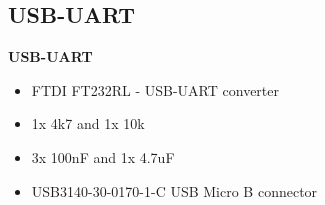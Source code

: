 
\subsection{USB-UART}

{\bf USB-UART}
\begin{itemize} \item FTDI FT232RL - USB-UART converter \item 1x 4k7 and 1x 10k
\item 3x 100nF and 1x 4.7uF \item USB3140-30-0170-1-C USB Micro B connector
\end{itemize}
